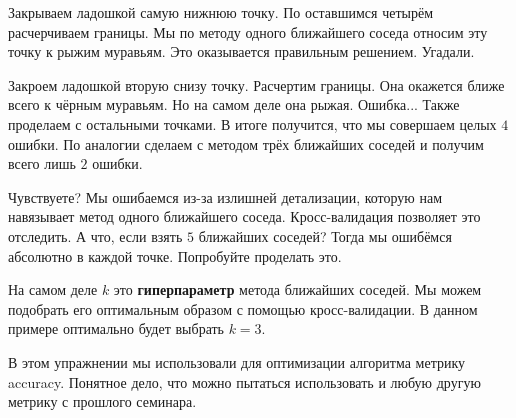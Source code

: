 \documentclass[12pt, a4paper, oneside]{article}
\theoremstyle{plain} %
\theoremstyle{definition}
\newcommand{\indef}[1]{\textbf{ \color{green} #1}}
\begin{document}
\begin{solution}
\begin{enumerate}
	Закрываем ладошкой самую нижнюю точку. По оставшимся четырём расчерчиваем границы. Мы по методу одного ближайшего соседа относим эту точку к рыжим муравьям. Это оказывается правильным решением. Угадали.

	Закроем ладошкой вторую снизу точку. Расчертим границы. Она окажется ближе всего к чёрным муравьям. Но на самом деле она рыжая. Ошибка... Также проделаем с остальными точками. В итоге получится, что мы совершаем целых $4$ ошибки. По аналогии сделаем с методом трёх ближайших соседей и получим всего лишь $2$ ошибки. 

	Чувствуете? Мы ошибаемся из-за излишней детализации, которую нам навязывает метод одного ближайшего соседа. Кросс-валидация позволяет это отследить. А что, если взять $5$ ближайших соседей? Тогда мы ошибёмся абсолютно в каждой точке. Попробуйте проделать это. 

	На самом деле $k$ это \indef{гиперпараметр} метода ближайших соседей. Мы можем подобрать его оптимальным образом с помощью кросс-валидации. В данном примере оптимально будет выбрать $k=3$. 
	
	В этом упражнении мы использовали для оптимизации алгоритма метрику accuracy. Понятное дело, что можно пытаться использовать и любую другую метрику с прошлого семинара. 
	\end{enumerate}
\end{solution}
\end{document}
